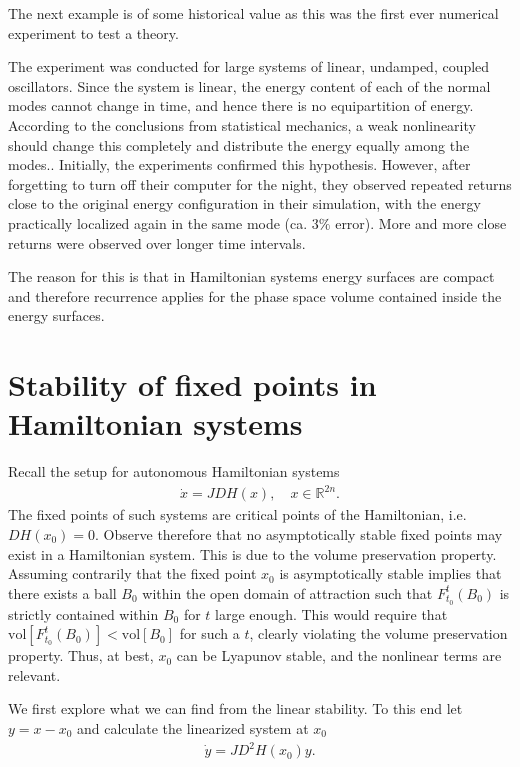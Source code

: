 The next example is of some historical value as this was the first ever numerical experiment to test a theory.
\begin{ex}
	The experiment was conducted for large systems of linear, undamped, coupled oscillators. Since the system is linear, the energy content of each of the normal modes cannot change in time, and hence there is no equipartition of energy. According to the conclusions from statistical mechanics, a weak nonlinearity should change this completely and distribute the energy equally among the modes.. Initially, the experiments confirmed this hypothesis. However, after forgetting to turn off their computer for the night, they observed repeated returns close to the original energy configuration in their simulation, with the energy practically localized again in the same mode (ca. $3\%$ error). More and more close returns were observed over longer time intervals.

	The reason for this is that in Hamiltonian systems energy surfaces are compact and therefore recurrence applies for the phase space volume contained inside the energy surfaces. 
\end{ex}

\section{Stability of fixed points in Hamiltonian systems}
Recall the setup for autonomous Hamiltonian systems
\begin{align}
	\dot{x} = JDH(x),\quad x \in \mathbb{R}^{2n}.
\end{align}
The fixed points of such systems are critical points of the Hamiltonian, i.e. $DH(x_0) = 0$. Observe therefore that no asymptotically stable fixed points may exist in a Hamiltonian system. This is due to the volume preservation property. Assuming contrarily that the fixed point $x_0$ is asymptotically stable implies that there exists a ball $B_0$ within the open domain of attraction such that $F_{t_0}^{t}(B_0)$ is strictly contained within $B_0$ for $t $ large enough. This would require that $ \textrm{vol} [F_{t_0}^{t}(B_0)] <  \textrm{vol} [B_0]$ for such a $t$, clearly violating the volume preservation property. Thus, at best, $x_0$ can be Lyapunov stable, and the nonlinear terms are relevant. 

We first explore what we can find from the linear stability. To this end let $y=x-x_0$ and calculate the linearized system at $x_0$
\begin{align}
	\dot{y} = JD^{2}H(x_0)y. \label{eq8:lin_hamiltonian}
\end{align}

